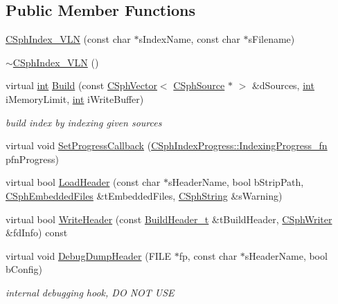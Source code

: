 \subsection*{Public Member Functions}
\begin{DoxyCompactItemize}
\item 
\hyperlink{classCSphIndex__VLN_a27abdf068526c879ff208daebfea89bc}{C\-Sph\-Index\-\_\-\-V\-L\-N} (const char $\ast$s\-Index\-Name, const char $\ast$s\-Filename)
\item 
\hyperlink{classCSphIndex__VLN_ad5c628b0fb3ea8c20a02ee29d36b5cb2}{$\sim$\-C\-Sph\-Index\-\_\-\-V\-L\-N} ()
\item 
virtual \hyperlink{sphinxexpr_8cpp_a4a26e8f9cb8b736e0c4cbf4d16de985e}{int} \hyperlink{classCSphIndex__VLN_ae7e6e2eba64cd58df4d54f858ffe43d9}{Build} (const \hyperlink{classCSphVector}{C\-Sph\-Vector}$<$ \hyperlink{classCSphSource}{C\-Sph\-Source} $\ast$ $>$ \&d\-Sources, \hyperlink{sphinxexpr_8cpp_a4a26e8f9cb8b736e0c4cbf4d16de985e}{int} i\-Memory\-Limit, \hyperlink{sphinxexpr_8cpp_a4a26e8f9cb8b736e0c4cbf4d16de985e}{int} i\-Write\-Buffer)
\begin{DoxyCompactList}\small\item\em build index by indexing given sources \end{DoxyCompactList}\item 
virtual void \hyperlink{classCSphIndex__VLN_a25ecbda2ffee84a157513ea35143b652}{Set\-Progress\-Callback} (\hyperlink{structCSphIndexProgress_ae4d818fe1ea74a250088fcc7b77fdf63}{C\-Sph\-Index\-Progress\-::\-Indexing\-Progress\-\_\-fn} pfn\-Progress)
\item 
virtual bool \hyperlink{classCSphIndex__VLN_a287c106cc1194869fcdcdd6b562bd011}{Load\-Header} (const char $\ast$s\-Header\-Name, bool b\-Strip\-Path, \hyperlink{structCSphEmbeddedFiles}{C\-Sph\-Embedded\-Files} \&t\-Embedded\-Files, \hyperlink{structCSphString}{C\-Sph\-String} \&s\-Warning)
\item 
virtual bool \hyperlink{classCSphIndex__VLN_a750bd222010dd13de24ca8df55fa8587}{Write\-Header} (const \hyperlink{structBuildHeader__t}{Build\-Header\-\_\-t} \&t\-Build\-Header, \hyperlink{classCSphWriter}{C\-Sph\-Writer} \&fd\-Info) const 
\item 
virtual void \hyperlink{classCSphIndex__VLN_ae8087604bfbd59de777c19a2385562d4}{Debug\-Dump\-Header} (F\-I\-L\-E $\ast$fp, const char $\ast$s\-Header\-Name, bool b\-Config)
\begin{DoxyCompactList}\small\item\em internal debugging hook, D\-O N\-O\-T U\-S\-E \end{DoxyCompactList}\item 

\end{DoxyCompactItemize}
